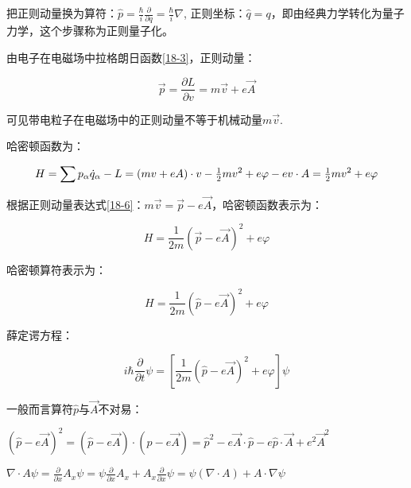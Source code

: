 把正则动量换为算符：$\widehat p = \frac{\hbar }{i}\frac{\partial }{{\partial q}} = \frac{\hbar }{i}\nabla $, 正则坐标：$\widehat q = q$，即由经典力学转化为量子力学，这个步骤称为正则量子化。

由电子在电磁场中拉格朗日函数\ref{18-3}，正则动量：

\begin{equation}\label{18-6}
\vec p = \frac{{\partial L}}{{\partial v}} = m\vec v + e\vec A
\end{equation}

可见带电粒子在电磁场中的正则动量不等于机械动量$m \vec v$.

哈密顿函数为：

\begin{equation}\label{18-7}
H = \sum {p_\alpha  \dot q_\alpha  }  - L = \left( {mv + eA} \right) \cdot v - {\textstyle{1 \over 2}}mv^2  + e\varphi  - ev \cdot A = {\textstyle{1 \over 2}}mv^2  + e\varphi
\end{equation}

根据正则动量表达式\ref{18-6}：$m\vec v = \vec p - e\vec A$，哈密顿函数表示为：

\begin{equation}\label{18-8}
H = \frac{1}{{2m}}\left( {\vec p - e\vec A} \right)^2  + e\varphi
\end{equation}

哈密顿算符表示为：

\begin{equation}\label{18-9}
H = \frac{1}{{2m}}\left( {\widehat p - e\vec A} \right)^2  + e\varphi
\end{equation}

薛定谔方程：

\begin{equation}\label{18-10}
i\hbar \frac{\partial }{{\partial t}}\psi  = \left[ {\frac{1}{{2m}}\left( {\widehat p - e\vec A} \right)^2  + e\varphi } \right]\psi
\end{equation}

一般而言算符$\hat p$与$\vec A$不对易：

\begin{center}
$\left( {\widehat p - e\vec A} \right)^2  = \left( {\widehat p - e\vec A} \right) \cdot \left( {\widehat p - e\vec A} \right) = \widehat p^2  - e\vec A \cdot \widehat p - e\widehat p \cdot \vec A + e^2 \vec A^2 $


$\nabla  \cdot A\psi  = \frac{\partial }{{\partial x}}A_x \psi  = \psi \frac{\partial }{{\partial x}}A_x  + A_x \frac{\partial }{{\partial x}}\psi  = \psi \left( {\nabla  \cdot A} \right) + A \cdot \nabla \psi $

\end{center}

